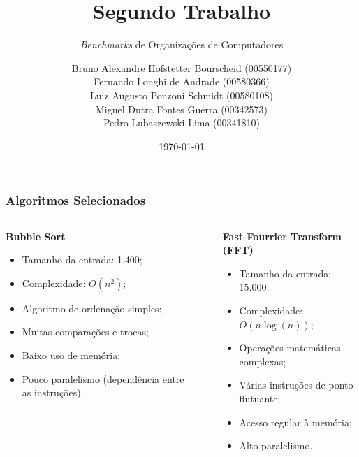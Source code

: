 \documentclass{beamer}
\title[Segundo Trabalho]{Segundo Trabalho}
\subtitle{\textit{Benchmarks} de Organizações de Computadores}
\author[Grupo 13]{Bruno Alexandre Hofstetter Bourscheid (00550177)
              \\ Fernando Longhi de Andrade (00580366)
              \\ Luiz Augusto Ponzoni Schmidt (00580108)
              \\ Miguel Dutra Fontes Guerra (00342573)
              \\ Pedro Lubaszewski Lima (00341810)}
\institute[]{INF01113\\Organização De Computadores B}
\date[\today]{\today}
\begin{document}
    \begin{frame}
        \maketitle
    \end{frame}

    \begin{frame}
        \frametitle{Algoritmos Selecionados}
        \begin{columns}
            \begin{column}{0.35\textwidth}
                \footnotesize

                \begin{center}
                    \textbf{Bubble Sort}
                \end{center}

                \begin{itemize}
                    \item Tamanho da entrada: 1.400;
                    \item Complexidade: $O(n^2)$;
                    \item Algoritmo de ordenação simples;
                    \item Muitas comparações e trocas;
                    \item Baixo uso de memória;
                    \item Pouco paralelismo (dependência entre as instruções).
                \end{itemize}

            \end{column}

            \begin{column}{0.02\textwidth}
                \rule{.1mm}{0.75\textheight}
            \end{column}

            \begin{column}{0.30\textwidth}
                \footnotesize

                \begin{center}
                    \textbf{Fast Fourrier Transform (FFT)}
                \end{center}

                \begin{itemize}
                    \item Tamanho da entrada: 15.000;
                    \item Complexidade: $O(n\log(n))$;
                    \item Operações matemáticas complexas;
                    \item Várias instruções de ponto flutuante;
                    \item Acesso regular à memória;
                    \item Alto paralelismo.
                \end{itemize}


\end{column}
\end{columns}
\end{frame}
\end{document}
